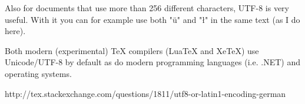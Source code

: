 Also for documents that use more than 256 different characters, UTF-8 is very useful. With it you can for example use both "ü" and "ł" in the same text (as I do here).

Both modern (experimental) TeX compilers (LuaTeX and XeTeX) use Unicode/UTF-8 by default as do modern programming languages (i.e. .NET) and operating systems.

http://tex.stackexchange.com/questions/1811/utf8-or-latin1-encoding-german

%
%
%
%
